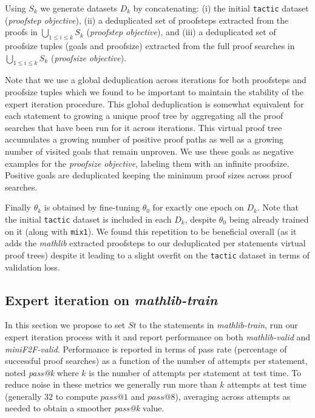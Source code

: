 \documentclass[nohyperref]{article}
\theoremstyle{plain}
\theoremstyle{definition}
\theoremstyle{remark}
\begin{document}
Using $S_k$ we generate datasets $D_k$ by concatenating: (i) the initial \texttt{tactic} dataset (\textit{proofstep objective}), (ii) a deduplicated set of proofsteps extracted from the proofs in $\bigcup_{1 \leq i\leq k}S_k$ (\textit{proofstep objective}), and (iii) a deduplicated set of proofsize tuples (goals and proofsize) extracted from the full proof searches in $\bigcup_{1 \leq i\leq k}S_k$ (\textit{proofsize objective}).

Note that we use a global deduplication across iterations for both proofsteps and proofsize tuples which we found to be important to maintain the stability of the expert iteration procedure. This global deduplication is somewhat equivalent for each statement to growing a unique proof tree by aggregating all the proof searches that have been run for it across iterations. This virtual proof tree accumulates a growing number of positive proof paths as well as a growing number of visited goals that remain unproven. We use these goals as negative examples for the \textit{proofsize objective}, labeling them with an infinite proofsize. Positive goals are deduplicated keeping the minimum proof sizes across proof searches.

Finally $\theta_k$ is obtained by fine-tuning $\theta_0$ for exactly one epoch on $D_k$. Note that the initial \texttt{tactic} dataset is included in each $D_k$, despite $\theta_0$ being already trained on it (along with \texttt{mix1}). We found this repetition to be beneficial overall (as it adds the \textit{mathlib} extracted proofsteps to our deduplicated per statements virtual proof trees) despite it leading to a slight overfit on the \texttt{tactic} dataset in terms of validation loss.

\subsection{Expert iteration on \textit{mathlib-train}}
\label{expit-mathlib-train}

In this section we propose to set $\mathit{St}$ to the statements in \textit{mathlib-train}, run our expert iteration process with it and report performance on both \textit{mathlib-valid} and \textit{miniF2F-valid}. Performance is reported in terms of pass rate (percentage of successful proof searches) as a function of the number of attempts per statement, noted \textit{pass@k} where $k$ is the number of attempts per statement at test time. To reduce noise in these metrics we generally run more than $k$ attempts at test time (generally $32$ to compute $pass@1$ and $pass@8$), averaging across attempts as needed to obtain a smoother \textit{pass@k} value.
\end{document}

